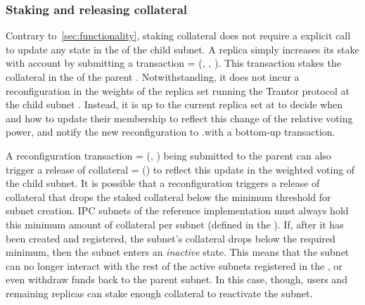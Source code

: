\subsubsection{Staking and releasing collateral}
Contrary to~\cref{sec:functionality}, staking collateral does not require a explicit call to update any state in the \gw of the child subnet. A replica simply increases its stake with account  by submitting a transaction  = (, , ). This transaction stakes the collateral in the \gw of the parent . Notwithstanding, it does not incur a reconfiguration in the weights of the replica set running the Trantor protocol at the child subnet . Instead, it is up to the current replica set at  to decide when and how to update their membership to reflect this change of the relative voting power, and notify the new reconfiguration to .\gw with a bottom-up transaction. 

A reconfiguration transaction  = (, \pof) being submitted to the parent can also trigger a release of collateral  = () to reflect this update in the weighted voting of the child subnet. It is possible that a reconfiguration triggers a release of collateral that drops the staked collateral below the minimum threshold for subnet creation. IPC subnets of the reference implementation must always hold this minimum amount of collateral per subnet (defined in the \gw). If, after it has been created and registered, the subnet's collateral drops below the required minimum, then the subnet enters an \emph{inactive} state. This means that the subnet can no longer interact with the rest of the active subnets registered in the \gw, or even withdraw funds back to the parent subnet. In this case, though, users and remaining replicas can stake enough collateral to reactivate the subnet. 
